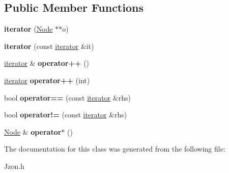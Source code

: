 \subsection*{Public Member Functions}
\begin{DoxyCompactItemize}
\item 
\hypertarget{class_jzon_1_1_array_1_1iterator_abffe612d42db17d396c61b6647271630}{{\bfseries iterator} (\hyperlink{class_jzon_1_1_node}{Node} $\ast$$\ast$o)}\label{class_jzon_1_1_array_1_1iterator_abffe612d42db17d396c61b6647271630}

\item 
\hypertarget{class_jzon_1_1_array_1_1iterator_ae2871b3106d7614bd574ec052d737d5d}{{\bfseries iterator} (const \hyperlink{class_jzon_1_1_array_1_1iterator}{iterator} \&it)}\label{class_jzon_1_1_array_1_1iterator_ae2871b3106d7614bd574ec052d737d5d}

\item 
\hypertarget{class_jzon_1_1_array_1_1iterator_a74995359ea2a8af5d5363df6d4423175}{\hyperlink{class_jzon_1_1_array_1_1iterator}{iterator} \& {\bfseries operator++} ()}\label{class_jzon_1_1_array_1_1iterator_a74995359ea2a8af5d5363df6d4423175}

\item 
\hypertarget{class_jzon_1_1_array_1_1iterator_aa1c8febf6e5559f10041703ab01ce225}{\hyperlink{class_jzon_1_1_array_1_1iterator}{iterator} {\bfseries operator++} (int)}\label{class_jzon_1_1_array_1_1iterator_aa1c8febf6e5559f10041703ab01ce225}

\item 
\hypertarget{class_jzon_1_1_array_1_1iterator_a0a0d4d9a34c8c2fb9e3bad664ff54187}{bool {\bfseries operator==} (const \hyperlink{class_jzon_1_1_array_1_1iterator}{iterator} \&rhs)}\label{class_jzon_1_1_array_1_1iterator_a0a0d4d9a34c8c2fb9e3bad664ff54187}

\item 
\hypertarget{class_jzon_1_1_array_1_1iterator_abaffa19d5577aa357a69847ac5c40794}{bool {\bfseries operator!=} (const \hyperlink{class_jzon_1_1_array_1_1iterator}{iterator} \&rhs)}\label{class_jzon_1_1_array_1_1iterator_abaffa19d5577aa357a69847ac5c40794}

\item 
\hypertarget{class_jzon_1_1_array_1_1iterator_a949ae4cb25f80f5489c822a6608aa7a0}{\hyperlink{class_jzon_1_1_node}{Node} \& {\bfseries operator$\ast$} ()}\label{class_jzon_1_1_array_1_1iterator_a949ae4cb25f80f5489c822a6608aa7a0}

\end{DoxyCompactItemize}


The documentation for this class was generated from the following file\-:\begin{DoxyCompactItemize}
\item 
Jzon.\-h\end{DoxyCompactItemize}
